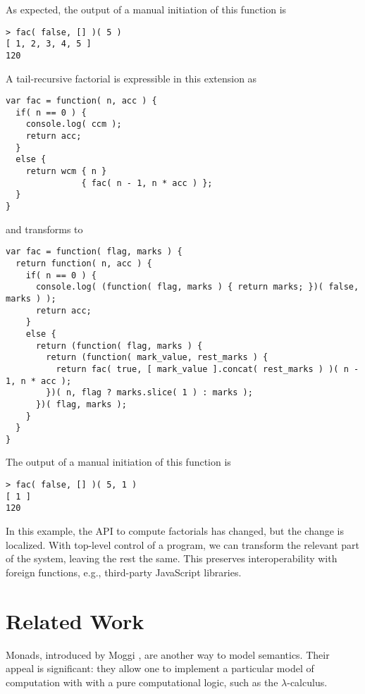 \documentclass{llncs}
\newcommand{\lc}[0]{$\lambda$-calculus}
\begin{document}
As expected, the output of a manual initiation of this function is
\begin{verbatim}
> fac( false, [] )( 5 )
[ 1, 2, 3, 4, 5 ]
120
\end{verbatim}

A tail-recursive factorial is expressible in this extension as
\begin{verbatim}
var fac = function( n, acc ) {
  if( n == 0 ) {
    console.log( ccm );
    return acc;
  }
  else {
    return wcm { n }
               { fac( n - 1, n * acc ) };
  }
}
\end{verbatim}
and transforms to
\begin{verbatim}
var fac = function( flag, marks ) {
  return function( n, acc ) {
    if( n == 0 ) {
      console.log( (function( flag, marks ) { return marks; })( false, marks ) );
      return acc;
    }
    else {
      return (function( flag, marks ) {
        return (function( mark_value, rest_marks ) {
          return fac( true, [ mark_value ].concat( rest_marks ) )( n - 1, n * acc );
        })( n, flag ? marks.slice( 1 ) : marks );
      })( flag, marks );
    }
  }
}
\end{verbatim}

The output of a manual initiation of this function is
\begin{verbatim}
> fac( false, [] )( 5, 1 )
[ 1 ]
120
\end{verbatim}

In this example, the API to compute factorials has changed, but the change is localized. With top-level control of a program, we can transform the relevant part of the system, leaving the rest the same. This preserves interoperability with foreign functions, e.g., third-party JavaScript libraries.
 
\section{Related Work}

Monads, introduced by Moggi \cite{moggi1989computational}, are another way to model semantics. Their appeal is significant: they allow one to implement a particular model of computation with with a pure computational logic, such as the \lc.
\end{document}
